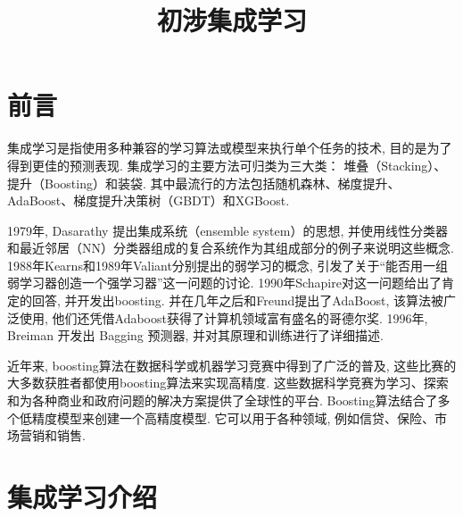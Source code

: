 \documentclass[lang=cn,11pt]{elegantpaper}
\title{初涉集成学习}
\date{}
\begin{document}

\newpage
\maketitle

	
\tableofcontents
\thispagestyle{empty}
\newpage
\normalsize
{}


\section{前言}

集成学习是指使用多种兼容的学习算法或模型来执行单个任务的技术, 目的是为了得到更佳的预测表现. 集成学习的主要方法可归类为三大类： 堆叠（Stacking）、提升（Boosting）和装袋. 其中最流行的方法包括随机森林、梯度提升、AdaBoost、梯度提升决策树（GBDT）和XGBoost. 

1979年, Dasarathy 提出集成系统（ensemble system）的思想, 并使用线性分类器和最近邻居（NN）分类器组成的复合系统作为其组成部分的例子来说明这些概念. 1988年Kearns和1989年Valiant分别提出的弱学习的概念, 引发了关于“能否用一组弱学习器创造一个强学习器”这一问题的讨论. 1990年Schapire对这一问题给出了肯定的回答, 并开发出boosting. 并在几年之后和Freund提出了AdaBoost, 该算法被广泛使用, 他们还凭借Adaboost获得了计算机领域富有盛名的哥德尔奖. 1996年, Breiman 开发出 Bagging 预测器, 并对其原理和训练进行了详细描述. 

近年来, boosting算法在数据科学或机器学习竞赛中得到了广泛的普及, 这些比赛的大多数获胜者都使用boosting算法来实现高精度. 这些数据科学竞赛为学习、探索和为各种商业和政府问题的解决方案提供了全球性的平台. Boosting算法结合了多个低精度模型来创建一个高精度模型. 它可以用于各种领域, 例如信贷、保险、市场营销和销售. 

\section{集成学习介绍}
\end{document}
